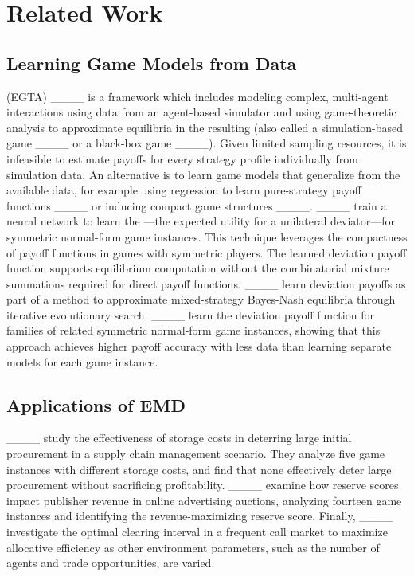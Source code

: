 \section{Related Work}
\subsection{Learning Game Models from Data}

 (EGTA) ____ is a framework which includes modeling complex, multi-agent interactions using data from an agent-based simulator and using game-theoretic analysis to approximate equilibria in the resulting  (also called a simulation-based game ____ or a black-box game ____).
Given limited sampling resources, it is infeasible to estimate payoffs for every strategy profile individually from simulation data.
An alternative is to learn game models that generalize from the available data, for example using regression to learn pure-strategy payoff functions  ____ or inducing compact game structures ____.
____ train a neural network to learn the ---the expected utility for a unilateral deviator---for symmetric normal-form game instances.
This technique leverages the compactness of payoff functions in games with symmetric players.
The learned deviation payoff function supports equilibrium computation without the combinatorial mixture summations required for direct payoff functions.
____ learn deviation payoffs as part of a method to approximate mixed-strategy Bayes-Nash equilibria through iterative evolutionary search. 
____ learn the deviation payoff function for families of related symmetric normal-form game instances, showing that this approach achieves higher payoff accuracy with less data than learning separate models for each game instance. 

\subsection{Applications of EMD}

____ study the effectiveness of storage costs in deterring large initial procurement in a supply chain management scenario.
They analyze five game instances with different storage costs, and find that none effectively deter large procurement without sacrificing profitability. 
____ examine how reserve scores impact publisher revenue in online advertising auctions, analyzing fourteen game instances and identifying the revenue-maximizing reserve score. 
Finally, ____ investigate the optimal clearing interval in a frequent call market to maximize allocative efficiency as other environment parameters, such as the number of agents and trade opportunities, are varied. 

